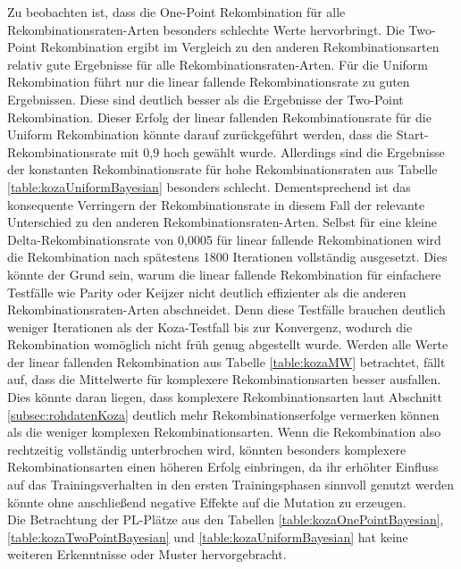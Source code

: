 Zu beobachten ist, dass die One-Point Rekombination für alle Rekombinationsraten-Arten besonders schlechte Werte hervorbringt.
Die Two-Point Rekombination ergibt im Vergleich zu den anderen Rekombinationsarten relativ gute Ergebnisse für alle Re\-kom\-bi\-na\-tions\-raten-Arten.
Für die Uniform Rekombination führt nur die linear fallende Rekombinationsrate zu guten Ergebnissen.
Diese sind deutlich besser als die Ergebnisse der Two-Point Rekombination.
Dieser Erfolg der linear fallenden Rekombinationsrate für die Uniform Rekombination könnte darauf zurückgeführt werden, dass die Start-Rekombinationsrate mit 0,9 hoch gewählt wurde.
Allerdings sind die Ergebnisse der konstanten Rekombinationsrate für hohe Rekombinationsraten aus Tabelle \ref{table:kozaUniformBayesian} besonders schlecht.
Dementsprechend ist das konsequente Verringern der Rekombinationsrate in diesem Fall der relevante Unterschied zu den anderen Rekombinationsraten-Arten.
Selbst für eine kleine Delta-Rekombinationsrate von 0,0005 für linear fallende Rekombinationen wird die Rekombination nach spätestens 1800 Iterationen vollständig ausgesetzt.
Dies könnte der Grund sein, warum die linear fallende Rekombination für einfachere Testfälle wie Parity oder Keijzer nicht deutlich effizienter als die anderen Re\-kom\-bi\-na\-tions\-raten-Arten abschneidet.
Denn diese Testfälle brauchen deutlich weniger Iterationen als der Koza-Testfall bis zur Konvergenz, wodurch die Rekombination womöglich nicht früh genug abgestellt wurde.
Werden alle Werte der linear fallenden Rekombination aus Tabelle \ref{table:kozaMW} betrachtet, fällt auf, dass die Mittelwerte für komplexere Rekombinationsarten besser ausfallen.
Dies könnte daran liegen, dass komplexere Rekombinationsarten laut Abschnitt \ref{subsec:rohdatenKoza} deutlich mehr Rekombinationserfolge vermerken können als die weniger komplexen Rekombinationsarten.
Wenn die Rekombination also rechtzeitig vollständig unterbrochen wird, könnten besonders komplexere Rekombinationsarten einen höheren Erfolg einbringen, da ihr erhöhter Einfluss auf das Trainingsverhalten in den ersten Trainingsphasen sinnvoll genutzt werden könnte ohne anschließend negative Effekte auf die Mutation zu erzeugen.\\
Die Betrachtung der PL-Plätze aus den Tabellen \ref{table:kozaOnePointBayesian}, \ref{table:kozaTwoPointBayesian} und \ref{table:kozaUniformBayesian} hat keine weiteren Erkenntnisse oder Muster hervorgebracht.
